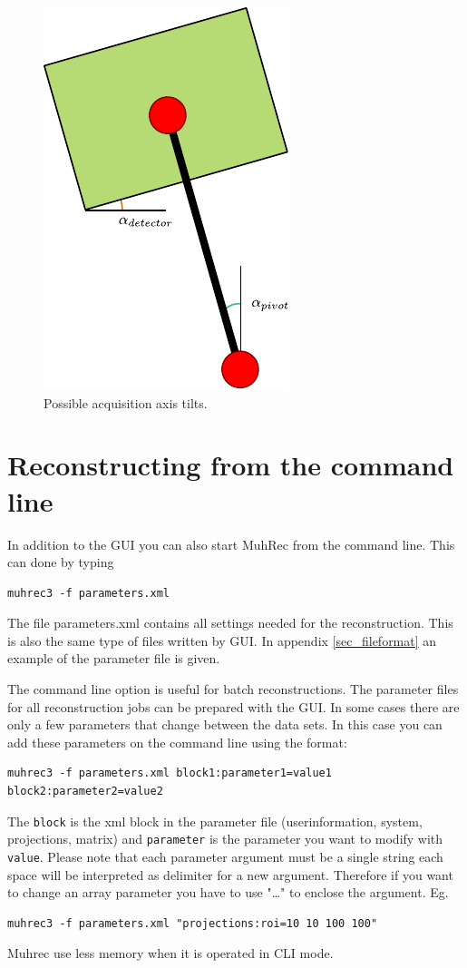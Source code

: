 \documentclass[a4paper]{scrreprt}
\begin{document}
\begin{figure}[ht!]
\centering
\includegraphics{figures/axis_tilt.pdf}
\caption{Possible acquisition axis tilts.}\label{fig_axistilt}
\end{figure}

\section{Reconstructing from the command line}\label{sec_cmdline}
In addition to the GUI you can also start MuhRec from the command line. This can done by typing
\begin{verbatim}
muhrec3 -f parameters.xml
\end{verbatim}
The file parameters.xml contains all settings needed for the reconstruction.
This is also the same type of files written by GUI. In appendix
\ref{sec_fileformat} an example of the parameter file is given.

The command line option is useful for batch reconstructions. The parameter files
for all reconstruction jobs can be prepared with the GUI. In some cases there
are only a few parameters that change between the data sets. In this case you can add these parameters on the command line using the format:
\begin{verbatim}
muhrec3 -f parameters.xml block1:parameter1=value1 block2:parameter2=value2 
\end{verbatim}
The \verb+block+ is the xml block in the parameter file (userinformation, system, projections, matrix) and \verb+parameter+ is the parameter you want to modify with \verb+value+.  Please note that each parameter argument must be a single string each space will be interpreted as delimiter for a new argument. Therefore if you want to change an array parameter you have to use "\ldots" to enclose the argument.  Eg.
\begin{verbatim}
muhrec3 -f parameters.xml "projections:roi=10 10 100 100" 
\end{verbatim}
Muhrec use less memory when it is operated in CLI mode. 
\end{document}

